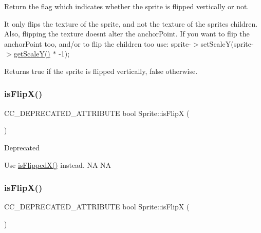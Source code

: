 Return the flag which indicates whether the sprite is flipped vertically or not.

It only flips the texture of the sprite, and not the texture of the sprite\textquotesingle{}s children. Also, flipping the texture doesn\textquotesingle{}t alter the anchor\+Point. If you want to flip the anchor\+Point too, and/or to flip the children too use\+: sprite-\/$>$set\+ScaleY(sprite-\/$>$\hyperlink{classNode_ab87661ab8940512baf2e7639ea55ff87}{get\+Scale\+Y()} $\ast$ -\/1);

\begin{DoxyReturn}{Returns}
true if the sprite is flipped vertically, false otherwise. 
\end{DoxyReturn}
\mbox{\label{classSprite_adec29867c0c49bb6f5642a377348da3d}} 
\subsubsection{\texorpdfstring{is\+Flip\+X()}{isFlipX()}\hspace{0.1cm}{\footnotesize\ttfamily [1/2]}}
{\footnotesize\ttfamily C\+C\+\_\+\+D\+E\+P\+R\+E\+C\+A\+T\+E\+D\+\_\+\+A\+T\+T\+R\+I\+B\+U\+TE bool Sprite\+::is\+FlipX (\begin{DoxyParamCaption}{ }\end{DoxyParamCaption})\hspace{0.3cm}{\ttfamily [inline]}}

\begin{DoxyRefDesc}{Deprecated}
\item[\hyperlink{deprecated__deprecated000040}{Deprecated}]Use \hyperlink{classSprite_af16052422347fb5a609f69191e9503e6}{is\+Flipped\+X()} instead.  NA  NA \end{DoxyRefDesc}
\mbox{\label{classSprite_adec29867c0c49bb6f5642a377348da3d}} 
\subsubsection{\texorpdfstring{is\+Flip\+X()}{isFlipX()}\hspace{0.1cm}{\footnotesize\ttfamily [2/2]}}
{\footnotesize\ttfamily C\+C\+\_\+\+D\+E\+P\+R\+E\+C\+A\+T\+E\+D\+\_\+\+A\+T\+T\+R\+I\+B\+U\+TE bool Sprite\+::is\+FlipX (\begin{DoxyParamCaption}{ }\end{DoxyParamCaption})\hspace{0.3cm}{\ttfamily [inline]}}

